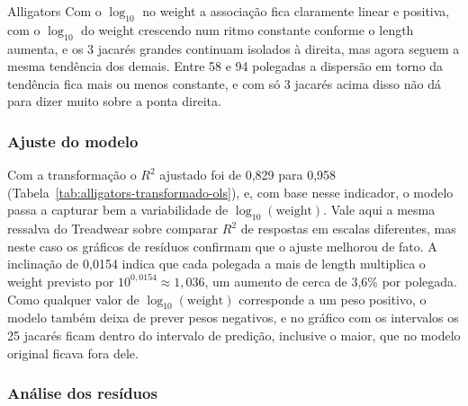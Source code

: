 \begin{dataset}{Alligators}
Com o $\log_{10}$ no weight a associação fica claramente linear e positiva, com o $\log_{10}$ do weight crescendo num ritmo constante conforme o length aumenta, e os 3 jacarés grandes continuam isolados à direita, mas agora seguem a mesma tendência dos demais. Entre 58 e 94 polegadas a dispersão em torno da tendência fica mais ou menos constante, e com só 3 jacarés acima disso não dá para dizer muito sobre a ponta direita.

\subsubsection{Ajuste do modelo}


Com a transformação o $R^2$ ajustado foi de 0,829 para 0,958 (Tabela~\ref{tab:alligators-transformado-ols}), e, com base nesse indicador, o modelo passa a capturar bem a variabilidade de $\log_{10}(\text{weight})$. Vale aqui a mesma ressalva do Treadwear sobre comparar $R^2$ de respostas em escalas diferentes, mas neste caso os gráficos de resíduos confirmam que o ajuste melhorou de fato. A inclinação de 0,0154 indica que cada polegada a mais de length multiplica o weight previsto por $10^{0{,}0154} \approx 1{,}036$, um aumento de cerca de 3,6\% por polegada. Como qualquer valor de $\log_{10}(\text{weight})$ corresponde a um peso positivo, o modelo também deixa de prever pesos negativos, e no gráfico com os intervalos os 25 jacarés ficam dentro do intervalo de predição, inclusive o maior, que no modelo original ficava fora dele.


\subsubsection{Análise dos resíduos}




\end{dataset}
